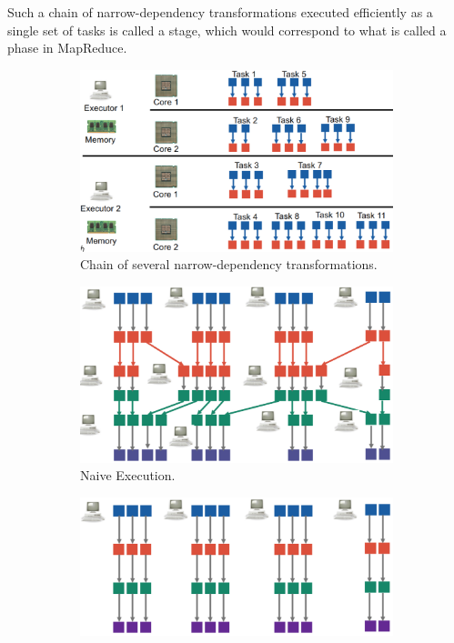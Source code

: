 Such a chain of narrow-dependency transformations executed efficiently as a single set of tasks is called a stage, which would correspond to what is called a phase in MapReduce.

\begin{figure}[h]
    \centering
    \begin{subfigure}{0.47\textwidth}
        \centering
        \includegraphics[width=\textwidth]{Figures/ChainTransformations.jpeg}
        \caption{Chain of several narrow-dependency transformations.}\label{subfig:NDchain}
    \end{subfigure}
    \hfill
    \begin{subfigure}{0.47\textwidth}
        \centering
        \includegraphics[width=\textwidth]{Figures/NaiveExecutionChain.jpeg}
        \caption{Naive Execution.}\label{subfig:NaiveEx}
    \end{subfigure}
    \begin{subfigure}{0.47\textwidth}
        \centering
        \includegraphics[width=\textwidth]{Figures/EfficientExecutionChain.jpeg}

\end{subfigure}
\end{figure}
